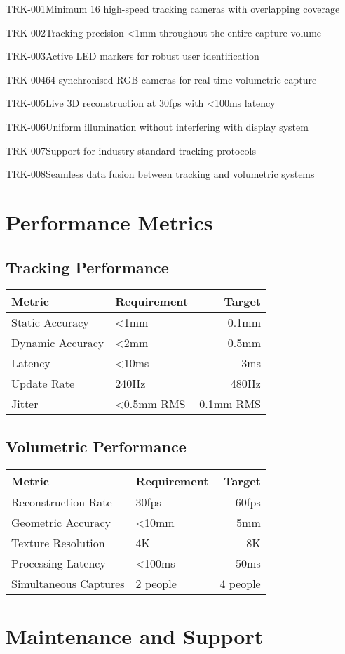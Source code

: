 \begin{requirement}{TRK-001}{Minimum 16 high-speed tracking cameras with overlapping coverage}
\begin{requirement}{TRK-002}{Tracking precision <1mm throughout the entire capture volume}
\begin{requirement}{TRK-003}{Active LED markers for robust user identification}
\begin{requirement}{TRK-004}{64 synchronised RGB cameras for real-time volumetric capture}
\begin{requirement}{TRK-005}{Live 3D reconstruction at 30fps with <100ms latency}
\begin{requirement}{TRK-006}{Uniform illumination without interfering with display system}
\begin{requirement}{TRK-007}{Support for industry-standard tracking protocols}
\begin{requirement}{TRK-008}{Seamless data fusion between tracking and volumetric systems}
\section{Performance Metrics}

\subsection{Tracking Performance}

\begin{table}[H]
\centering
\begin{tabularx}{\textwidth}{@{}lXr@{}}
\toprule
\textbf{Metric} & \textbf{Requirement} & \textbf{Target} \\
\midrule
Static Accuracy & <1mm & 0.1mm \\
Dynamic Accuracy & <2mm & 0.5mm \\
Latency & <10ms & 3ms \\
Update Rate & 240Hz & 480Hz \\
Jitter & <0.5mm RMS & 0.1mm RMS \\
\bottomrule
\end{tabularx}
\end{table}

\subsection{Volumetric Performance}

\begin{table}[H]
\centering
\begin{tabularx}{\textwidth}{@{}lXr@{}}
\toprule
\textbf{Metric} & \textbf{Requirement} & \textbf{Target} \\
\midrule
Reconstruction Rate & 30fps & 60fps \\
Geometric Accuracy & <10mm & 5mm \\
Texture Resolution & 4K & 8K \\
Processing Latency & <100ms & 50ms \\
Simultaneous Captures & 2 people & 4 people \\
\bottomrule
\end{tabularx}
\end{table}

\section{Maintenance and Support}


\end{requirement}
\end{requirement}
\end{requirement}
\end{requirement}
\end{requirement}
\end{requirement}
\end{requirement}
\end{requirement}

